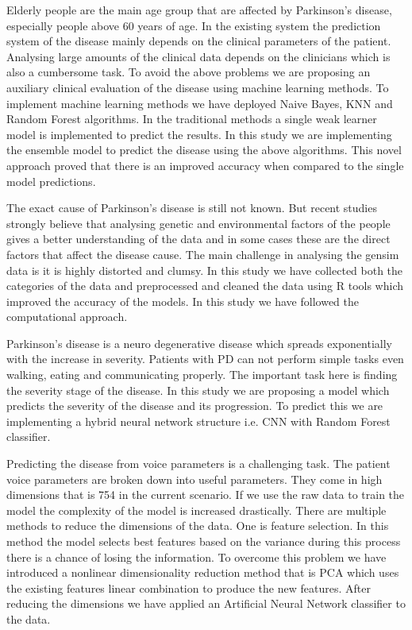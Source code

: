 \documentclass[conference]{IEEEtran}
\begin{document}
Elderly people are the main age group that are affected by Parkinson’s disease, especially people above 60 years of age. In the existing system the prediction system of the disease mainly depends on the clinical parameters of the patient. Analysing large amounts of the clinical data depends on the clinicians which is also a cumbersome task. To avoid the above problems we are proposing an auxiliary clinical evaluation of the disease using machine learning methods. To implement  machine learning methods we have deployed Naive Bayes, KNN and Random Forest algorithms. In the traditional methods a single weak learner model is implemented to predict the results. In this study we are implementing the ensemble model to predict the disease using the above algorithms. This novel approach proved that there is an improved accuracy when compared to the single model predictions\cite{9763618}.	

The exact cause of Parkinson's disease is still not known. But recent studies strongly believe that analysing genetic and environmental factors of the people gives a better understanding of the data and in some cases these are the direct factors that affect the disease cause. The main challenge in analysing the gensim data is it is highly distorted and clumsy.  In this study we have collected both the categories of the data and preprocessed and cleaned the data using R tools which improved the accuracy of the models. In this study we have followed the computational approach\cite{9315926}.

Parkinson’s disease is a neuro degenerative disease which spreads exponentially with the increase in severity. Patients with PD can not perform simple tasks even walking, eating and communicating properly. The important task here is finding the severity stage of the disease.  In this study we are proposing a model which predicts the severity of the disease and its progression. To predict this we are implementing a hybrid neural network structure i.e. CNN with Random Forest classifier\cite{9456292}.

Predicting the disease from voice parameters is a challenging task. The patient voice parameters are broken down into useful parameters. They come in high dimensions that is 754 in the current scenario. If  we use the raw data to train the model the complexity of the model is increased drastically. There are multiple methods to reduce the dimensions of the data. One is feature selection. In this method the model selects best features based on the variance during this process there is a chance of losing the information. To overcome this problem we have introduced a nonlinear dimensionality reduction method that is PCA which uses the existing features linear combination to produce the new features. After reducing the dimensions we have applied an Artificial Neural Network classifier  to the data\cite{9065876}.
\end{document}
